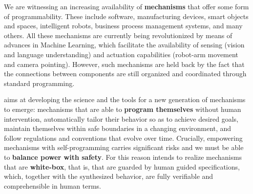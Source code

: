 



We are witnessing an increasing availability of \textbf{mechanisms}
that offer some form of programmability.
These include software, manufacturing devices, smart objects and
spaces, intelligent robots, %
business process management systems, and
many others.
All these mechanisms are  currently being revolutionized by means of
advances in Machine Learning, which facilitate the availability of sensing
 (vision and language understanding) and actuation
capabilities (robot-arm movement and camera pointing).
 However, 
such mechanisms are held back by the fact that the connections
 between components are still organized and coordinated through
 standard programming.

\project %
aims at developing the {science} and the {tools} for a new
generation of mechanisms to emerge: mechanisms that are able to
\textbf{program themselves} without human intervention, 
automatically tailor their behavior so as to
achieve desired goals, maintain themselves within safe boundaries in a
changing environment, and  follow regulations and conventions
that evolve over time.
Crucially, empowering mechanisms with self-programming carries significant risks and we must be able to \textbf{balance power with safety}. For this reason
\project intends 
to realize mechanisms that are \textbf{white-box},
that is, 
that are {guarded by human guided
specifications}, which, together with the synthesized behavior, 
are fully verifiable and comprehensible in human terms.


